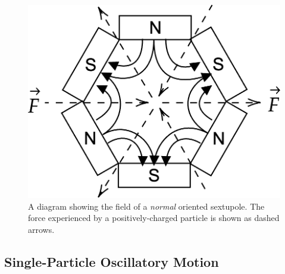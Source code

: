 \documentclass[a4paper,twoside,11pt]{report}
\begin{document}
\begin{figure}
    \centering
    \includegraphics*[width=0.4\linewidth]{sextupole.png}
    \caption[Diagram of a sextupole magnetic field]{A diagram showing the field of a \textit{normal} oriented sextupole. The force experienced by a positively-charged particle is shown as dashed arrows.}\label{fig:sextupole}
\end{figure}

\subsection{Single-Particle Oscillatory Motion}
\end{document}
